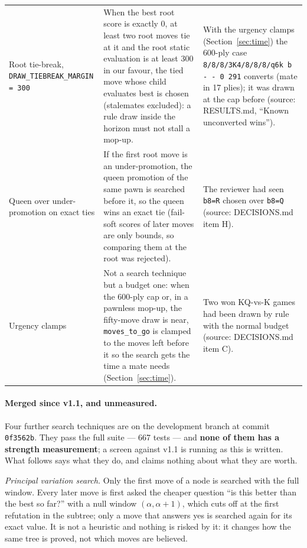 \documentclass[11pt,a4paper]{article}
\newcommand{\src}[1]{{\small(source: #1)}}
\newcommand{\code}[1]{\texttt{#1}}
\begin{document}
{\begin{longtable}{@{}>{\raggedright\arraybackslash}p{3.4cm}>{\raggedright\arraybackslash}p{5.2cm}>{\raggedright\arraybackslash}p{5.9cm}@{}}
Root tie-break, \code{DRAW\_TIEBREAK\_MARGIN = 300} & When the best root score is exactly 0, at least two root moves tie at it and the root static evaluation is at least 300 in our favour, the tied move whose child evaluates best is chosen (stalemates excluded): a rule draw inside the horizon must not stall a mop-up. & With the urgency clamps (Section~\ref{sec:time}) the 600-ply case \code{8/8/8/3K4/8/8/8/q6k b - - 0 291} converts (mate in 17 plies); it was drawn at the cap before \src{RESULTS.md, ``Known unconverted wins''}. \\
Queen over under-promotion on exact ties & If the first root move is an under-promotion, the queen promotion of the same pawn is searched before it, so the queen wins an exact tie (fail-soft scores of later moves are only bounds, so comparing them at the root was rejected). & The reviewer had seen \code{b8=R} chosen over \code{b8=Q} \src{DECISIONS.md item H}. \\
Urgency clamps & Not a search technique but a budget one: when the 600-ply cap or, in a pawnless mop-up, the fifty-move draw is near, \code{moves\_to\_go} is clamped to the moves left before it so the search gets the time a mate needs (Section~\ref{sec:time}). & Two won KQ-vs-K games had been drawn by rule with the normal budget \src{DECISIONS.md item C}. \\
\end{longtable}
}

\paragraph{Merged since v1.1, and unmeasured.} Four further search techniques are on the development
branch at commit \code{0f3562b}. They pass the full suite --- 667 tests --- and \textbf{none of them
has a strength measurement}; a screen against v1.1 is running as this is written. What follows says
what they do, and claims nothing about what they are worth.

\emph{Principal variation search.} Only the first move of a node is searched with the full window.
Every later move is first asked the cheaper question ``is this better than the best so far?'' with a
null window $(\alpha, \alpha+1)$, which cuts off at the first refutation in the subtree; only a move
that answers yes is searched again for its exact value. It is not a heuristic and nothing is risked
by it: it changes how the same tree is proved, not which moves are believed.
\end{document}
